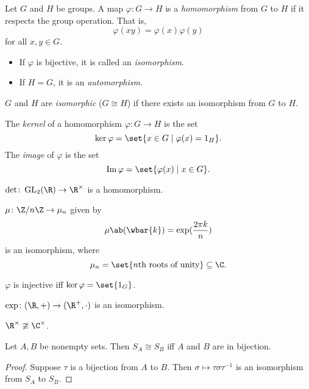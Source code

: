 \begin{definition*}[Homomorphism] \label{def:group:homo}
    Let $G$ and $H$ be groups.
    A map $\varphi\colon G \to H$ is a \emph{homomorphism} from
    $G$ to $H$ if it respects the group operation.
    That is, \[
        \varphi(xy) = \varphi(x)\varphi(y)
    \] for all $x, y \in G$.

    \begin{itemize}
        \item If $\varphi$ is bijective, it is called an \emph{isomorphism}.
        \item If $H = G$, it is an \emph{automorphism}.
    \end{itemize}

    $G$ and $H$ are \emph{isomorphic} ($G \cong H$) if there exists an
    isomorphism from $G$ to $H$.
\end{definition*}

\begin{definition*}[Kernel] \label{def:group:kernel}
    The \emph{kernel} of a homomorphism $\varphi\colon G \to H$ is the set
    \[
        \ker \varphi = \set{x \in G \mid \varphi(x) = 1_H}.
    \] The \emph{image} of $\varphi$ is the set \[
        \im \varphi = \set{\varphi(x) \mid x \in G}.
    \]
\end{definition*}

\begin{examples}
    \item $\det\colon \GL_2(\R) \to \R^\times$ is a homomorphism.
    \item $\mu\colon \Z/n\Z \to \mu_n$ given by \[
        \mu\ab(\wbar{k}) = \exp(\frac{2\pi k}{n})
    \] is an isomorphism, where \[
        \mu_n = \set{n\text{th roots of unity}} \subseteq \C.
    \]
    \item $\varphi$ is injective iff $\ker \varphi = \set{1_G}$.
    \item $\exp\colon (\R, +) \to (\R^+, \cdot)$ is an isomorphism.
    \item $\R^\times \ncong \C^\times$.
    \item Let $A, B$ be nonempty sets.
    Then $S_A \cong S_B$ iff $A$ and $B$ are in bijection.
    \begin{proof}
        Suppose $\tau$ is a bijection from $A$ to $B$.
        Then $\sigma \mapsto \tau \sigma \tau^{-1}$ is an isomorphism
        from $S_A$ to $S_B$.
    \end{proof}
\end{examples}
